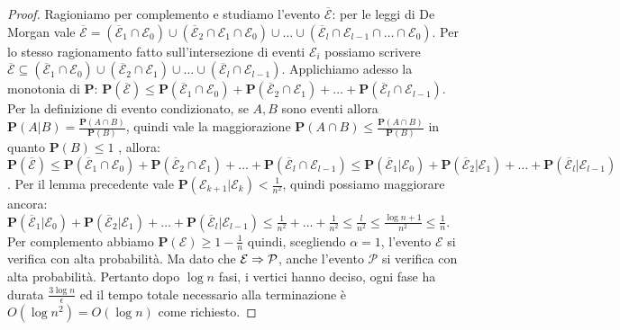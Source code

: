 \documentclass{article}
\begin{document}
\begin{proof}
    Ragioniamo per 
    complemento e studiamo l'evento $\overline{\mathcal{E}}$: per le 
    leggi di De Morgan vale $\overline{\mathcal{E}} = (\overline{\mathcal{E}}_1
    \cap \mathcal{E}_0) \cup (\overline{\mathcal{E}}_2
    \cap \mathcal{E}_1 \cap \mathcal{E}_0) \cup \ldots \cup 
    (\overline{\mathcal{E}}_l \cap \mathcal{E}_{l-1} \cap \ldots
    \cap \mathcal{E}_0)$. Per lo stesso ragionamento fatto sull'intersezione di
    eventi $\mathcal{E}_i$ possiamo scrivere $\overline{\mathcal{E}} \subseteq
    (\overline{\mathcal{E}}_1
    \cap \mathcal{E}_0) \cup (\overline{\mathcal{E}}_2
    \cap \mathcal{E}_1 ) \cup \ldots \cup 
    (\overline{\mathcal{E}}_l \cap \mathcal{E}_{l-1})$. Applichiamo adesso 
    la monotonia di $\mathbf{P}$: $\mathbf{P}(\overline{\mathcal{E}}) \leq
    \mathbf{P}(\overline{\mathcal{E}}_1
    \cap \mathcal{E}_0) + \mathbf{P}(\overline{\mathcal{E}}_2
    \cap \mathcal{E}_1 ) + \ldots + 
    \mathbf{P}(\overline{\mathcal{E}}_l \cap \mathcal{E}_{l-1})$. Per la 
    definizione di evento condizionato, se $A,B$ sono eventi allora $
    \mathbf{P}(A|B) = \frac{\mathbf{P}(A\cap B)}{\mathbf{P}(B)}$, quindi vale 
    la maggiorazione ${\mathbf{P}(A\cap B)} \leq 
    \frac{\mathbf{P}(A\cap B)}{\mathbf{P}(B)}$ in quanto $\mathbf{P}(B) \leq 1$
    , allora: 
    $\mathbf{P}(\overline{\mathcal{E}}) \leq
    \mathbf{P}(\overline{\mathcal{E}}_1
    \cap \mathcal{E}_0) + \mathbf{P}(\overline{\mathcal{E}}_2
    \cap \mathcal{E}_1 ) + \ldots + 
    \mathbf{P}(\overline{\mathcal{E}}_l \cap \mathcal{E}_{l-1}) \leq
    \mathbf{P}(\overline{\mathcal{E}}_1
    | \mathcal{E}_0) + \mathbf{P}(\overline{\mathcal{E}}_2
    | \mathcal{E}_1 ) + \ldots + 
    \mathbf{P}(\overline{\mathcal{E}}_l | \mathcal{E}_{l-1})$. Per il 
    lemma precedente vale $\mathbf{P}(\mathcal{E}_{k+1}|
    \mathcal{E}_{k}) < \frac{1}{n^2}$, quindi possiamo maggiorare ancora:
    $\mathbf{P}(\overline{\mathcal{E}}_1
    | \mathcal{E}_0) + \mathbf{P}(\overline{\mathcal{E}}_2
    | \mathcal{E}_1 ) + \ldots + 
    \mathbf{P}(\overline{\mathcal{E}}_l | \mathcal{E}_{l-1}) \leq 
    \frac{1}{n^2} + \ldots + \frac{1}{n^2} \leq \frac{l}{n^2} \leq 
    \frac{\log{n} + 1}{n^2} \leq \frac{1}{n}$. Per complemento abbiamo 
    $\mathbf{P}(\mathcal{E}) \geq 1 - \frac{1}{n}$ quindi, scegliendo $\alpha
    = 1$, l'evento $\mathcal{E}$ si verifica con alta probabilit\`a. Ma
    dato che $\mathcal{E} \Rightarrow \mathcal{P}$, anche l'evento $
    \mathcal{P}$ si verifica con alta probabilit\`a. Pertanto dopo $\log{n}$
    fasi, i vertici hanno deciso, ogni fase ha durata $\frac{3\log{n}}{\epsilon}$
    ed il tempo totale necessario alla terminazione \`e $O(\log{n}^2) = 
    O(\log{n})$ come richiesto.
\end{proof}
\end{document}
